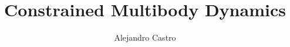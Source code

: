\documentclass[journal]{./IEEEtran/IEEEtran}
\begin{document}
\title{Constrained Multibody Dynamics}


\author{Alejandro Castro}


\maketitle

%



%
\IEEEpeerreviewmaketitle

%
%



%
%
%
%
\end{document}
